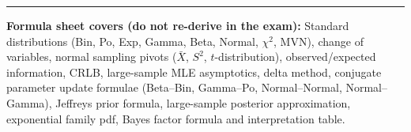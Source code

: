 \documentclass[11pt, a4paper]{article}
\begin{document}
\vspace{1cm}
{\color{rulegray}\hrule}
\vspace{0.3cm}
\begin{small}
\color{darkgray}
\textbf{Formula sheet covers (do not re-derive in the exam):} Standard distributions (Bin, Po, Exp, Gamma, Beta, Normal, $\chi^2$, MVN), change of variables, normal sampling pivots ($\bar{X}$, $S^2$, $t$-distribution), observed/expected information, CRLB, large-sample MLE asymptotics, delta method, conjugate parameter update formulae (Beta--Bin, Gamma--Po, Normal--Normal, Normal--Gamma), Jeffreys prior formula, large-sample posterior approximation, exponential family pdf, Bayes factor formula and interpretation table.
\end{small}
\end{document}
